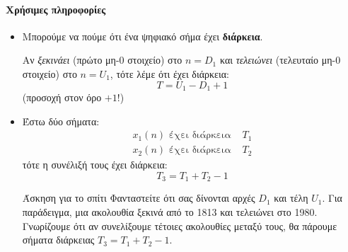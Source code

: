 \documentclass[11pt,a4paper,notitlepage,fleqn,draft]{article}
\begin{document}
\paragraph{Χρήσιμες πληροφορίες}
\begin{itemize}
	\item Μπορούμε να πούμε ότι ένα ψηφιακό σήμα έχει \textbf{διάρκεια}.
	
	\begin{minipage}{0.5\textwidth}
			Αν \emph{ξεκινάει} (πρώτο μη-0 στοιχείο) στο \( n=D_1 \) και \emph{τελειώνει} (τελευταίο μη-0 στοιχείο) στο \( n=U_1 \), τότε λέμε ότι έχει διάρκεια:
		\[
		T = U_1-D_1 + 1
		\]
		(προσοχή στον όρο \( +1 \)!)
	\end{minipage}
\begin{minipage}{0.5\textwidth}
	\begin{center}
	\end{center}
\end{minipage}
	
	\item Έστω δύο σήματα:
	\begin{align*}
		x_1(n) \text{ έχει διάρκεια } & T_1\\
		x_2(n) \text{ έχει διάρκεια } & T_2
	\end{align*}
	τότε η συνέλιξή τους έχει διάρκεια:
	\[
	T_3 = T_1+T_2-1
	\]
	
	\begin{questionbox}{Άσκηση για το σπίτι}
 		Φανταστείτε ότι σας δίνονται αρχές \( D_1 \) και τέλη \( U_1 \). Για παράδειγμα, μια ακολουθία
		ξεκινά από το 1813 και τελειώνει στο 1980. Γνωρίζουμε ότι αν συνελίξουμε τέτοιες ακολουθίες
		μεταξύ τους, θα πάρουμε σήματα διάρκειας \( T_3 = T_1+T_2-1 \).
		

\end{questionbox}
\end{itemize}
\end{document}
